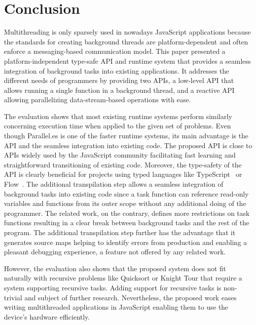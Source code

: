 \section{Conclusion}\label{sec:conclusion}
Multithreading is only sparsely used in nowadays JavaScript applications because the standards for creating background threads are platform-dependent and often enforce a messaging-based communication model. This paper presented a platform-independent type-safe API and runtime system that provides a seamless integration of background tasks into existing applications. It addresses the different needs of programmers by providing two APIs, a low-level API that allows running a single function in a background thread, and a reactive API allowing parallelizing data-stream-based operations with ease. 

The evaluation shows that most existing runtime systems perform similarly concerning execution time when applied to the given set of problems. Even though Parallel.es is one of the faster runtime systems, its main advantage is the API and the seamless integration into existing code. The proposed API is close to APIs widely used by the JavaScript community facilitating fast learning and straightforward transitioning of existing code. Moreover, the type-safety of the API is clearly beneficial for projects using typed languages like TypeScript~\cite{typescript} or Flow~\cite{flow}. The additional transpilation step allows a seamless integration of background tasks into existing code since a task function can reference read-only variables and functions from its outer scope without any additional doing of the programmer. The related work, on the contrary, defines more restrictions on task functions resulting in a clear break between background tasks and the rest of the program. The additional transpilation step further has the advantage that it generates source maps helping to identify errors from production and enabling a pleasant debugging experience, a feature not offered by any related work. 

However, the evaluation also shows that the proposed system does not fit naturally with recursive problems like Quicksort or Knight Tour that require a system supporting recursive tasks. Adding support for recursive tasks is non-trivial and subject of further research. Nevertheless, the proposed work eases writing multithreaded applications in JavaScript enabling them to use the device's hardware efficiently.